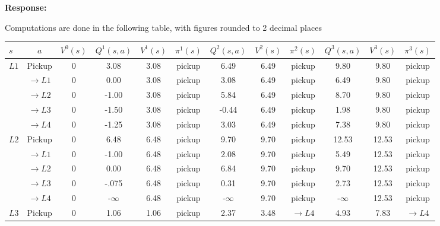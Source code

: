 \documentclass[12pt, letterpaper]{article}
\begin{document}
\textbf{Response:}

Computations are done in the following table, with figures rounded to 2 decimal places

\begin{footnotesize}
    \begin{tabular}{|l|c|c|c|c|c|c|c|c|c|c|c|}        
    \hline
    $s$ & $a$  & $V^0(s)$ & $Q^1(s,a)$ & $V^1(s)$ & $\pi^1(s)$ & $Q^2(s,a)$ & $V^2(s)$ & $\pi^2(s)$ & $Q^3(s,a)$ & $V^3(s)$ & $\pi^3(s)$ \\ \hline
    \multirow{5}{*}{$L1$}   & Pickup            & 0 & 3.08      & 3.08  & pickup & 6.49 & 6.49  & pickup & 9.80 & 9.80  & pickup      \\ \cline{2-12}
                            & $\rightarrow L1$  & 0 & 0.00      & 3.08  & pickup & 3.08 & 6.49  & pickup  & 6.49 & 9.80  & pickup   \\ \cline{2-12}
                            & $\rightarrow L2$  & 0 & -1.00     & 3.08  & pickup & 5.84 & 6.49  & pickup & 8.70 & 9.80  & pickup  \\ \cline{2-12}
                            & $\rightarrow L3$  & 0 & -1.50     & 3.08  & pickup & -0.44 & 6.49  & pickup & 1.98 & 9.80  & pickup   \\ \cline{2-12}
                            & $\rightarrow L4$  & 0 & -1.25     & 3.08  & pickup & 3.03 & 6.49  & pickup & 7.38 & 9.80  & pickup \\ \cline{2-12}
    \hline
    \multirow{5}{*}{$L2$}   & Pickup            & 0 & 6.48      & 6.48  & pickup & 9.70 & 9.70 & pickup & 12.53 & 12.53 & pickup \\ \cline{2-12}
                            & $\rightarrow L1$  & 0 & -1.00     & 6.48  & pickup & 2.08 & 9.70 & pickup & 5.49 & 12.53 & pickup \\ \cline{2-12}
                            & $\rightarrow L2$  & 0 & 0.00      & 6.48  & pickup & 6.84 & 9.70 & pickup & 9.70 & 12.53 & pickup \\ \cline{2-12}
                            & $\rightarrow L3$  & 0 & -.075     & 6.48  & pickup & 0.31 & 9.70 & pickup & 2.73 & 12.53 & pickup \\ \cline{2-12}
                            & $\rightarrow L4$  & 0 & -$\infty$ & 6.48  & pickup & -$\infty$ & 9.70 & pickup & -$\infty$ & 12.53  & pickup\\ \cline{2-12}
    \hline
    \multirow{5}{*}{$L3$}   & Pickup            & 0 & 1.06      & 1.06 & pickup & 2.37 & 3.48 & $\rightarrow L4$ & 4.93 & 7.83 & $\rightarrow L4$ \\ \cline{2-12}

\end{tabular}
\end{footnotesize}
\end{document}

